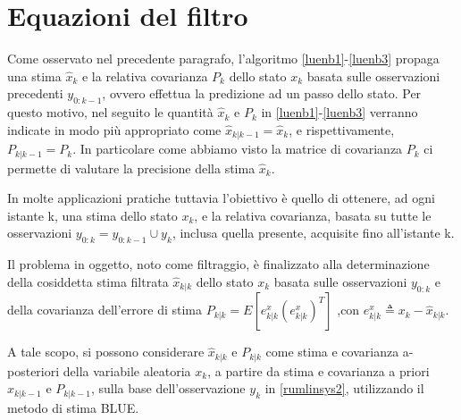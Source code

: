 \section{Equazioni del filtro}

Come osservato nel precedente paragrafo, l’algoritmo \eqref{luenb1}-\eqref{luenb3} propaga una stima $\hat{x}_k$ e la relativa covarianza $P_k$ dello stato $x_k$ basata sulle osservazioni precedenti $y_{0:k-1}$, ovvero effettua la predizione ad un passo dello stato. Per questo motivo, nel seguito le quantità $\hat{x}_k$ e $P_k$ in \eqref{luenb1}-\eqref{luenb3} verranno indicate in modo più appropriato come $\hat{x}_{k|k-1}=\hat{x}_k$, e rispettivamente, $P_{k|k-1}=P_k$.
In particolare come abbiamo visto la matrice di covarianza $P_k$ ci permette di valutare la precisione della stima $\hat{x}_k$.

In molte applicazioni pratiche tuttavia l’obiettivo è quello di ottenere, ad ogni istante k, una stima dello stato $x_k$, e la relativa covarianza, basata su tutte le osservazioni $y_{0:k}  = y_{0:k-1}\cup{y_k}$, inclusa quella presente, acquisite fino all’istante k.

Il problema in oggetto, noto come filtraggio, è finalizzato alla determinazione della cosiddetta stima filtrata $\hat{x}_{ k|k}$ dello stato $x_k$ basata sulle osservazioni $y_{0:k}$ e della covarianza dell'errore di stima $P_{k|k} = E[e^x_{k|k}(e^x_{k|k})^T]$ ,con $e^x_{k|k}\triangleq x_k-\hat{x}_{k|k}$. 

A tale scopo, si possono considerare $\hat{x}_{k|k}$ e $P_{k|k}$ come stima e covarianza a-posteriori della variabile aleatoria $x_k$, a partire da stima e covarianza a priori $\hat{x}_{k|k-1}$ e $P_{k|k-1}$, sulla base dell'osservazione $y_k$ in \eqref{rumlinsys2}, utilizzando il metodo di stima BLUE.

